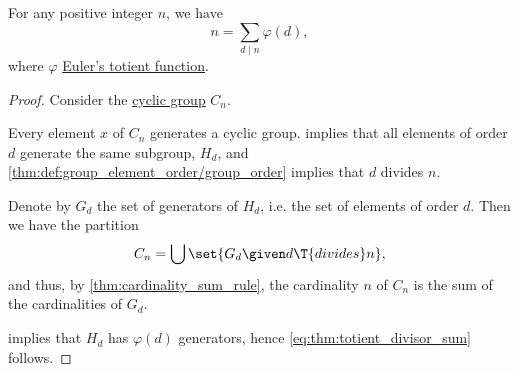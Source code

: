 \begin{theorem}\label{thm:totient_divisor_sum}
  For any positive integer \( n \), we have
  \begin{equation}\label{eq:thm:totient_divisor_sum}
    n = \sum_{d \mid n} \varphi(d),
  \end{equation}
  where \( \varphi \) \hyperref[def:eulers_totient_function]{Euler's totient function}.
\end{theorem}
\begin{proof}
  Consider the \hyperref[def:cyclic_group]{cyclic group} \( C_n \).

  Every element \( x \) of \( C_n \) generates a cyclic group.  implies that all elements of order \( d \) generate the same subgroup, \( H_d \), and \cref{thm:def:group_element_order/group_order} implies that \( d \) divides \( n \).

  Denote by \( G_d \) the set of generators of \( H_d \), i.e. the set of elements of order \( d \). Then we have the partition
  \begin{equation*}
    C_n = \bigcup \set{ G_d \given d \T{divides} n },
  \end{equation*}
  and thus, by \cref{thm:cardinality_sum_rule}, the cardinality \( n \) of \( C_n \) is the sum of the cardinalities of \( G_d \).

   implies that \( H_d \) has \( \varphi(d) \) generators, hence \eqref{eq:thm:totient_divisor_sum} follows.
\end{proof}

